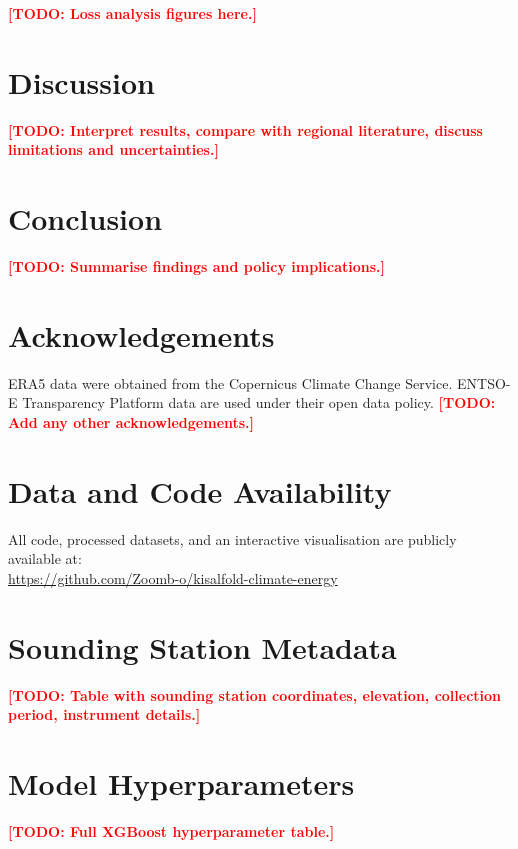 \documentclass[11pt,a4paper]{article}
\newcommand{\todo}[1]{\textcolor{red}{\textbf{[TODO: #1]}}}
\begin{document}
\todo{Loss analysis figures here.}

\section{Discussion}
\label{sec:discussion}

\todo{Interpret results, compare with regional literature, 
discuss limitations and uncertainties.}

\section{Conclusion}
\label{sec:conclusion}

\todo{Summarise findings and policy implications.}

\section*{Acknowledgements}

ERA5 data were obtained from the Copernicus Climate Change Service. 
ENTSO-E Transparency Platform data are used under their open data policy. 
\todo{Add any other acknowledgements.}

\section*{Data and Code Availability}

All code, processed datasets, and an interactive visualisation are 
publicly available at:\\
\url{https://github.com/Zoomb-o/kisalfold-climate-energy}




\appendix

\section{Sounding Station Metadata}
\label{app:soundings}

\todo{Table with sounding station coordinates, elevation, 
collection period, instrument details.}

\section{Model Hyperparameters}
\label{app:hyperparams}

\todo{Full XGBoost hyperparameter table.}
\end{document}
